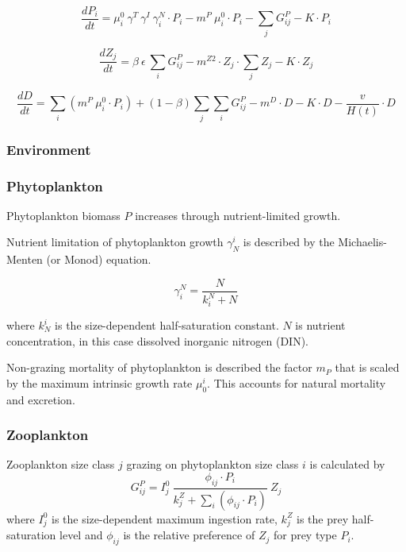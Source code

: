 \documentclass[template.tex]{subfiles}
\begin{document}
\begin{equation}
    \frac{d P_i}{d t} =
    \mu_i^{0} \ \gamma^{T} \ \gamma^{I} \ \gamma_i^N \cdot   P_i  %
    - m^P  \ \mu_i^{0} \cdot P_i %
    - \sum_{j} G_{ij}^P %
    - K \cdot P_i%
\end{equation}

\begin{equation}
    \frac{d Z_j}{d t} =
    \beta \ \epsilon \ \sum_{i} G_{ij}^P %
    - m^{Z2} \cdot Z_j \cdot \sum_{j} Z_j  %
    - K \cdot Z_j %
\end{equation}

\begin{equation}
    \frac{d D}{d t} = 
    \sum_{i}( m^P  \ \mu_i^{0} \cdot P_i) %
    + (1 - \beta) \sum_{j} \sum_{i} G_{ij}^P %
    - m^D \cdot D %
    - K \cdot D %
    - \frac{v}{H(t)} \cdot D %
\end{equation}


\subsubsection{Environment}



\subsubsection{Phytoplankton}
Phytoplankton biomass $P$ increases through  nutrient-limited growth. 

Nutrient limitation of phytoplankton growth $\gamma^i_N$ is described by the Michaelis-Menten (or Monod) equation.

\begin{equation}
    \gamma_i^N =  \frac{N}{k_i^N + N} 
\end{equation}

where $k^i_N$ is the size-dependent half-saturation constant. $N$ is nutrient concentration, in this case dissolved inorganic nitrogen (DIN).


Non-grazing mortality of phytoplankton is described the factor $m_P$ that is scaled by the maximum intrinsic growth rate $\mu^i_{0}$. This accounts for natural mortality and excretion.

\subsubsection{Zooplankton}
Zooplankton size class $j$ grazing on phytoplankton size class $i$ is calculated by
\begin{equation}
    G_{ij}^P = I_j^0 \ \frac{ \phi_{ij} \cdot P_i }{ k_j^Z + \sum_{i}(\phi_{ij} \cdot P_i) } \ Z_j
\end{equation}
where $I_j^0$ is the size-dependent maximum ingestion rate, $k_j^Z$ is the prey half-saturation level and $\phi_{ij}$ is the relative preference of $Z_j$ for prey type $P_i$.\\
\end{document}
